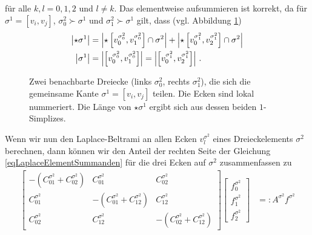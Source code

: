     für alle \( k,l = 0,1,2 \) und \( l\neq k \).
    Das elementweise aufsummieren ist korrekt, da für \( \sigma^{1}=\left[ v_{i}, v_{j} \right]\),
    \( \sigma^{2}_{0}\succ\sigma^{1} \) und \( \sigma^{2}_{1}\succ\sigma^{1} \) gilt, dass
    (vgl. Abbildung \ref{figLokaleNummerierung})
    \begin{align}
      \left| \star\sigma^{1} \right| 
        &= \left| \star \left[ v^{\sigma^{2}_{0}}_{0}, v^{\sigma^{2}_{0}}_{1} \right] \cap \sigma^{2}\right|
         + \left| \star \left[ v^{\sigma^{2}_{1}}_{0}, v^{\sigma^{2}_{1}}_{2} \right] \cap \sigma^{2}\right| \\
      \left| \sigma^{1} \right| 
          &= \left|  \left[ v^{\sigma^{2}_{0}}_{0}, v^{\sigma^{2}_{0}}_{1} \right] \right|
           = \left|  \left[ v^{\sigma^{2}_{1}}_{0}, v^{\sigma^{2}_{1}}_{2} \right] \right| \,\text{.}
    \end{align}
    \begin{figure}
      \centering
      \caption[lokale Nummerierung]{Zwei benachbarte Dreiecke (links \( \sigma^{2}_{0} \), rechts \(
          \sigma^{2}_{1} \)), die sich die gemeinsame Kante \( \sigma^{1}=\left[ v_{i}, v_{j} \right] \) teilen.
          Die Ecken sind lokal nummeriert.
          Die Länge von \( \star\sigma^{1} \) ergibt sich aus dessen beiden \( 1 \)-Simplizes.}
      \label{figLokaleNummerierung}
    \end{figure}
    Wenn wir nun den Laplace-Beltrami an allen Ecken \( v^{\sigma^{2}}_{l} \) eines Dreieckelements 
    \( \sigma^{2} \) berechnen, dann können wir den Anteil der rechten Seite
    der Gleichung \eqref{eqLaplaceElementSummanden}
    für die drei Ecken auf \( \sigma^{2} \) zusammenfassen zu
    \begin{align}
      \begin{bmatrix}
        -\left( C^{\sigma^{2}}_{01} + C^{\sigma^{2}}_{02}\right) & C^{\sigma^{2}}_{01} & C^{\sigma^{2}}_{02} \\
        C^{\sigma^{2}}_{01} & -\left( C^{\sigma^{2}}_{01} + C^{\sigma^{2}}_{12}\right) & C^{\sigma^{2}}_{12} \\
        C^{\sigma^{2}}_{02} & C^{\sigma^{2}}_{12} & -\left( C^{\sigma^{2}}_{02} + C^{\sigma^{2}}_{12}\right)
      \end{bmatrix}
      \begin{bmatrix}
        f^{\sigma^{2}}_{0} \\ f^{\sigma^{2}}_{1} \\ f^{\sigma^{2}}_{2}
      \end{bmatrix}
        &=: A^{\sigma^{2}} f^{\sigma^{2}}
    \end{align}
